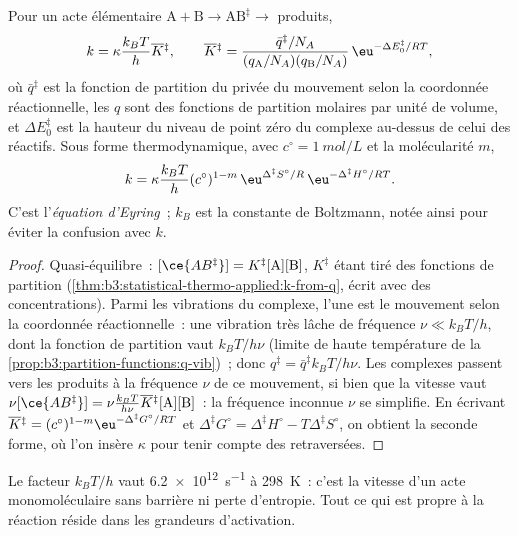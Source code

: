 \begin{theorem}\label{thm:b3:rate-theories:eyring}
Pour un acte élémentaire $\mathrm{A + B} \to \mathrm{AB}^{\ddagger} \to$ produits,
\[
  k = \kappa\frac{k_BT}{h}\overline{K}{}^{\ddagger}, \qquad
  \overline{K}{}^{\ddagger} = \frac{\bar q^{\ddagger}/N_A}{(q_{\mathrm A}/N_A)(q_{\mathrm B}/N_A)}\,\eu^{-\Delta E_0^{\ddagger}/RT},
\]
où $\bar q^{\ddagger}$ est la fonction de partition du 
privée du mouvement selon la coordonnée réactionnelle, les $q$ sont des
fonctions de partition molaires par unité de volume, et
$\Delta E_0^{\ddagger}$ est la hauteur du niveau de point zéro du
complexe au-dessus de celui des réactifs. Sous forme thermodynamique,
avec $c^\circ = \qty{1}{mol/L}$ et la
molécularité $m$,
\[
  k = \kappa\frac{k_BT}{h}(c^\circ)^{1-m}\,\eu^{\Delta^{\ddagger}S^\circ/R}\,\eu^{-\Delta^{\ddagger}H^\circ/RT}.
\]
C'est l'\emph{équation d'Eyring}~; $k_B$ est la
constante de Boltzmann, notée ainsi pour éviter la confusion avec $k$.
\end{theorem}

\begin{proof}
Quasi-équilibre~: $[\ce{AB^{\ddagger}}] = K^{\ddagger}[\mathrm A][\mathrm B]$,
$K^{\ddagger}$ étant tiré des fonctions de partition
(\cref{thm:b3:statistical-thermo-applied:k-from-q}, écrit avec des
concentrations).
Parmi les vibrations du complexe, l'une est le mouvement selon la
coordonnée réactionnelle~: une vibration très lâche de fréquence
$\nu \ll k_BT/h$, dont la fonction de partition
vaut $k_BT/h\nu$ (limite de haute température de la
\cref{prop:b3:partition-functions:q-vib})~; donc $q^{\ddagger} = \bar q^{\ddagger}k_BT/h\nu$.
Les complexes passent vers les produits à la fréquence $\nu$ de ce
mouvement, si bien que la vitesse vaut
$\nu[\ce{AB^{\ddagger}}] = \nu\frac{k_BT}{h\nu}\overline{K}{}^{\ddagger}[\mathrm A][\mathrm B]$~:
la fréquence inconnue $\nu$ se simplifie. En écrivant
$\overline{K}{}^{\ddagger} = (c^\circ)^{1-m}\eu^{-\Delta^{\ddagger}G^\circ/RT}$ et $\Delta^{\ddagger}G^\circ = \Delta^{\ddagger}H^\circ - T\Delta^{\ddagger}S^\circ$,
on obtient la seconde forme, où l'on insère $\kappa$ pour tenir compte
des retraversées.
\end{proof}

Le facteur $k_BT/h$ vaut \qty{6.2e12}{s^{-1}} à \qty{298}{K}~: c'est la
vitesse d'un acte monomoléculaire sans barrière ni perte d'entropie.
Tout ce qui est propre à la réaction réside dans les grandeurs
d'activation.

